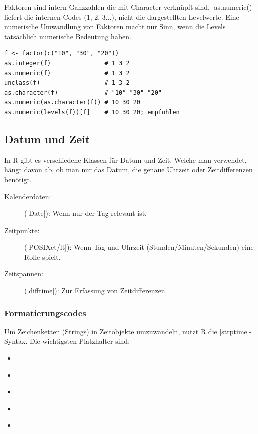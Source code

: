 \documentclass[10pt,twocolumn]{scrartcl}
\renewcommand{\lstinline}{\mycoloredinline}
\begin{document}
Faktoren sind intern Ganzzahlen die mit Character verknüpft sind. \lstinline|as.numeric()| liefert die internen Codes (1, 2, 3...), nicht die dargestellten Levelwerte. Eine numerische Umwandlung von Faktoren macht nur Sinn, wenn die Levels tatsächlich numerische Bedeutung haben.

\begin{lstlisting}
f <- factor(c("10", "30", "20"))
as.integer(f)               # 1 3 2
as.numeric(f)               # 1 3 2
unclass(f)                  # 1 3 2
as.character(f)             # "10" "30" "20"
as.numeric(as.character(f)) # 10 30 20
as.numeric(levels(f))[f]    # 10 30 20; empfohlen
\end{lstlisting}


\subsection{Datum und Zeit}

In R gibt es verschiedene Klassen für Datum und Zeit. Welche man verwendet, hängt davon ab, ob man nur das Datum, die genaue Uhrzeit oder Zeitdifferenzen benötigt.

\begin{description}
\item[Kalenderdaten:] (\lstinline|Date|): Wenn nur der Tag relevant ist.
\item[Zeitpunkte:] (\lstinline|POSIXct/lt|): Wenn Tag und Uhrzeit (Stunden/Minuten/Sekunden) eine Rolle spielt.
\item[Zeitspannen:] (\lstinline|difftime|): Zur Erfassung von Zeitdifferenzen.
\end{description}

\subsubsection{Formatierungscodes}

Um Zeichenketten (Strings) in Zeitobjekte umzuwandeln, nutzt R die \lstinline|strptime|-Syntax. Die wichtigsten Platzhalter sind:

\begin{itemize}
  \item \lstinline|%Y| / \lstinline|%y|: Jahr 4-stellig (2025) / 2-stellig (25).
  \item \lstinline|%m| / \lstinline|%b| / \lstinline|%B|: Monat als Zahl / Kürzel / Name (Abhängig von Ländereinstellung).
  \item \lstinline|%d|: Tag des Monats (01--31).
  \item \lstinline|%j|: Tag des Jahres (001--366).
  \item \lstinline|%H| / \lstinline|%M| / \lstinline|%S|: Stunde / Minute / Sekunde.
\end{itemize}
\end{document}
